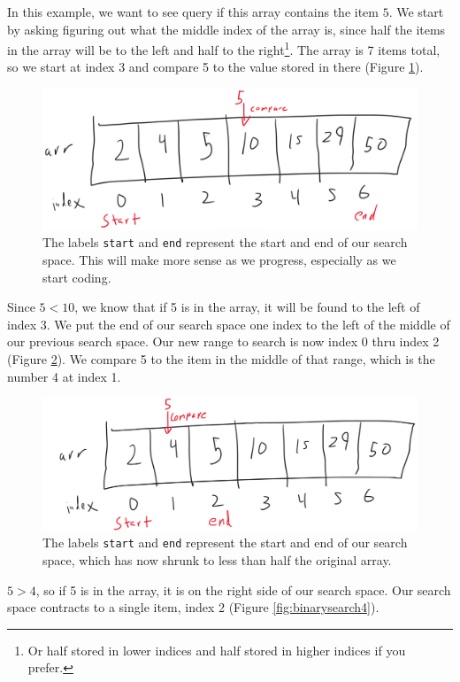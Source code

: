 In this example, we want to see query if this array contains the item $5.$   We start by asking figuring out what the middle index of the array is, since half the items in the array will be to the left and half to the right\footnote{Or half stored in lower indices and half stored in higher indices if you prefer.}.  The array is 7 items total, so we start at index 3  and compare 5 to the value stored in there (Figure \ref{fig:binarysearch2}).

\begin{figure}[h!]
	\centering
	\includegraphics[width=0.7\linewidth]{pics/binarySearch2}
	\caption{The labels \texttt{start} and \texttt{end} represent the start and end of our search space.  This will make more sense as we progress, especially as we start coding.}
	\label{fig:binarysearch2}
\end{figure}

Since $5 < 10$, we know that if 5 is in the array, it will be found to the left of index 3.  We put the end of our search space one index to the left of the middle of our previous search space.  Our new range to search is now index 0 thru index 2 (Figure \ref{fig:binarysearch3}).  We compare 5 to the item in the middle of that range, which is the number 4 at index 1.  



\begin{figure}[h!]
	\centering
	\includegraphics[width=0.7\linewidth]{pics/binarySearch3}
	\caption{The labels \texttt{start} and \texttt{end} represent the start and end of our search space, which has now shrunk to less than half the original array.}
	\label{fig:binarysearch3}
\end{figure}

$5 > 4$, so if 5 is in the array, it is on the right side of our search space.  Our search space contracts to a single item, index 2 (Figure \ref{fig:binarysearch4}).  

